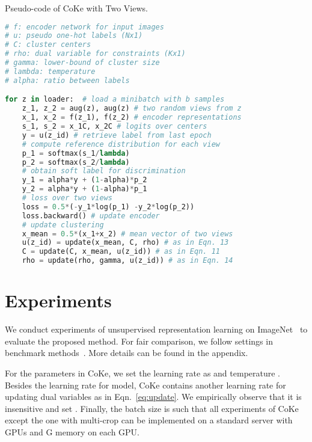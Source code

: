\documentclass[10pt,twocolumn,letterpaper]{article}
\begin{document}
\begin{algorithm}[t]
\caption{Pseudo-code of CoKe with Two Views.}
\label{alg:code}
\begin{lstlisting}[language=python]
# f: encoder network for input images
# u: pseudo one-hot labels (Nx1)
# C: cluster centers
# rho: dual variable for constraints (Kx1)
# gamma: lower-bound of cluster size
# lambda: temperature
# alpha: ratio between labels

for z in loader:  # load a minibatch with b samples
    z_1, z_2 = aug(z), aug(z) # two random views from z
    x_1, x_2 = f(z_1), f(z_2) # encoder representations
    s_1, s_2 = x_1C, x_2C # logits over centers
    y = u(z_id) # retrieve label from last epoch
    # compute reference distribution for each view
    p_1 = softmax(s_1/lambda)
    p_2 = softmax(s_2/lambda)
    # obtain soft label for discrimination
    y_1 = alpha*y + (1-alpha)*p_2 
    y_2 = alpha*y + (1-alpha)*p_1
    # loss over two views
    loss = 0.5*(-y_1*log(p_1) -y_2*log(p_2)) 
    loss.backward() # update encoder
    # update clustering
    x_mean = 0.5*(x_1+x_2) # mean vector of two views
    u(z_id) = update(x_mean, C, rho) # as in Eqn. 13
    C = update(C, x_mean, u(z_id)) # as in Eqn. 11
    rho = update(rho, gamma, u(z_id)) # as in Eqn. 14
\end{lstlisting}
\end{algorithm}


\section{Experiments}\label{sec:exp}
We conduct experiments of unsupervised representation learning on ImageNet~\cite{RussakovskyDSKS15} to evaluate the proposed method. For fair comparison, we follow settings in benchmark methods~\cite{CaronMMGBJ20,ChenK0H20,abs-2003-04297}. More details can be found in the appendix. 

For the parameters in CoKe, we set the learning rate as  and temperature . Besides the learning rate for model, CoKe contains another learning rate  for updating dual variables as in Eqn.~\ref{eq:update}. We empirically observe that it is insensitive and set . Finally, the batch size is  such that all experiments of CoKe except the one with multi-crop can be implemented on a standard server with  GPUs and G memory on each GPU.
\end{document}
